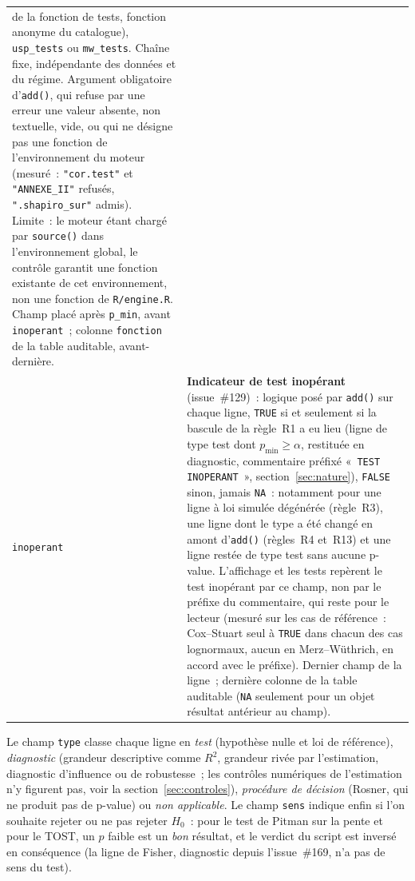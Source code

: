 \documentclass[a4paper,11pt]{article}
\newcommand{\code}[1]{\texttt{\small #1}}
\begin{document}
\begin{center}
\begin{tabular}{@{}p{2.3cm}p{12.9cm}@{}}
de la fonction de tests, fonction anonyme du catalogue), \code{usp\_tests} ou \code{mw\_tests}.
Chaîne fixe, indépendante des données et du régime. Argument obligatoire d'\code{add()}, qui
refuse par une erreur une valeur absente, non textuelle, vide, ou qui ne désigne pas une fonction
de l'environnement du moteur (mesuré~: \code{"cor.test"} et \code{"ANNEXE\_II"} refusés,
\code{".shapiro\_sur"} admis). Limite~: le moteur étant chargé par \code{source()} dans
l'environnement global, le contrôle garantit une fonction existante de cet environnement, non
une fonction de \code{R/engine.R}. Champ placé après \code{p\_min}, avant \code{inoperant}~;
colonne \code{fonction} de la table auditable, avant-dernière. \\
\code{inoperant} & \textbf{Indicateur de test inopérant} (issue~\#129)~: logique posé par
\code{add()} sur chaque ligne, \code{TRUE} si et seulement si la bascule de la règle~R1 a eu lieu
(ligne de type test dont $p_{\min} \ge \alpha$, restituée en diagnostic, commentaire préfixé
«~\code{TEST INOPERANT}~», section~\ref{sec:nature}), \code{FALSE} sinon, jamais \code{NA}~:
notamment pour une ligne à loi simulée dégénérée (règle~R3), une ligne dont le type a été changé
en amont d'\code{add()} (règles~R4 et~R13) et une ligne restée de type test sans aucune p-value.
L'affichage et les tests repèrent le test inopérant par ce champ, non par le préfixe du
commentaire, qui reste pour le lecteur (mesuré sur les cas de référence~: Cox--Stuart seul à
\code{TRUE} dans chacun des cas lognormaux, aucun en Merz--Wüthrich, en accord avec le
préfixe). Dernier champ de la ligne~; dernière colonne de la table auditable (\code{NA}
seulement pour un objet résultat antérieur au champ). \\
\bottomrule
\end{tabular}
\end{center}

Le champ \code{type} classe chaque ligne en \emph{test} (hypothèse nulle et loi de référence),
\emph{diagnostic} (grandeur descriptive comme $R^2$, grandeur rivée par l'estimation,
diagnostic d'influence ou de robustesse~; les contrôles numériques de l'estimation n'y
figurent pas, voir la section~\ref{sec:controles}),
\emph{procédure de décision} (Rosner, qui ne produit pas de p-value) ou \emph{non applicable}.
Le champ \code{sens} indique enfin si l'on souhaite rejeter ou ne pas rejeter $H_0$~: pour le
test de Pitman sur la pente et pour le TOST, un $p$ faible est un \emph{bon} résultat, et le
verdict du script est inversé en conséquence (la ligne de Fisher, diagnostic depuis
l'issue~\#169, n'a pas de sens du test).
\end{document}
